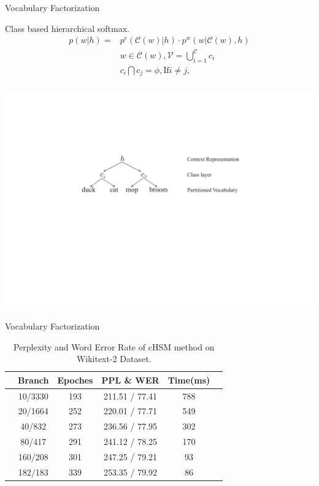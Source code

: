 \documentclass[english]{beamer} %
\begin{document}
\begin{frame}[<+->]{Vocabulary Factorization}

Class based hierarchical softmax.
  \begin{equation}
  \begin{split}
p(w|h)=&p^c(\mathcal{C}(w)|h)\cdot p^w(w|\mathcal{C}(w),h) \\
& w\in \mathcal{C}(w),\mathcal{V}=\bigcup _{i = 1}^\mathcal{C}{c_i} \\
&c_i \bigcap c_j=\phi, \text{If} i\ne j, \\
\end{split}
\end{equation}

  \begin{center}
    \includegraphics[scale=0.6]{case_chsm}
  \end{center}
\end{frame}

\begin{frame}[<+->]{Vocabulary Factorization}
\begin{table}
  \centering
  \caption{Perplexity and Word Error Rate of cHSM method on Wikitext-2 Dataset.\label{table:clustering}}
  \begin{tabular}{lccccc} \toprule
  &Branch& Epoches& PPL \& WER &Time(ms)\\\midrule
  &10/3330&193&211.51 / 77.41 &788\\
  &20/1664&252&220.01 / 77.71&549\\
  &40/832&273&236.56 / 77.95&302\\
  &80/417&291& 241.12 / 78.25&170\\
  &160/208&301&247.25 / 79.21&93\\
  &182/183&339&253.35 / 79.92&86\\
\bottomrule
\end{tabular}
\end{table}
\end{frame}
\end{document}
